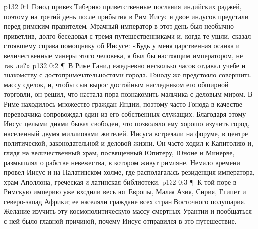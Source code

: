 \author{Комиссия срединников}
\vs p132 0:1 Гонод привез Тиберию приветственные послания индийских раджей, поэтому на третий день после прибытия в Рим Иисус и двое индусов предстали перед римским правителем. Мрачный император в этот день был необычно приветлив, долго беседовал с тремя путешественниками и, когда те ушли, сказал стоявшему справа помощнику об Иисусе: «Будь у меня царственная осанка и величественные манеры этого человека, я был бы настоящим императором, не так ли?»
\vs p132 0:2 \P\ В Риме Ганид ежедневно несколько часов отдавал учебе и знакомству с достопримечательностями города. Гоноду же предстояло совершить массу сделок, и, чтобы сын вырос достойным наследником его обширной торговли, он решил, что настала пора познакомить мальчика с деловым миром. В Риме находилось множество граждан Индии, поэтому часто Гонода в качестве переводчика сопровождал один из его собственных служащих. Благодаря этому Иисус целыми днями бывал свободен, что позволяло ему хорошо изучить город, населенный двумя миллионами жителей. Иисуса встречали на форуме, в центре политической, законодательной и деловой жизни. Он часто ходил к Капитолию и, глядя на величественный храм, посвященный Юпитеру, Юноне и Минерве, размышлял о рабстве невежества, в котором живут римляне. Немало времени провел Иисус и на Палатинском холме, где располагалась резиденция императора, храм Аполлона, греческая и латинская библиотеки.
\vs p132 0:3 \P\ К той поре в Римскую империю уже входили весь юг Европы, Малая Азия, Сирия, Египет и северо\hyp{}запад Африки; ее населяли граждане всех стран Восточного полушария. Желание изучить эту космополитическую массу смертных Урантии и пообщаться с ней было главной причиной, почему Иисус отправился в это путешествие.
